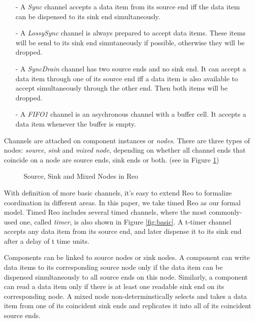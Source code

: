 \documentclass[conference, a4paper]{IEEEtran}
\begin{document}
\begin{itemize}
  \item [-] A \emph{Sync} channel accepts a data item from its source end iff the data item can be
    dispensed to its sink end simultaneously.
  \item [-] A \emph{LossySync} channel is always prepared to accept data items. These items will be
    send to its sink end simutaneously if possible, otherwise they will be dropped.
  \item [-] A \emph{SyncDrain} channel has two source ends and no sink end. It can accept a data
    item through one of its source end iff a data item is also available to accept simultaneously
    through the other end. Then both items will be dropped.
  \item [-] A \emph{FIFO1} channel is an asychronous channel with a buffer cell. It accepts a
    data item whenever the buffer is empty. 
\end{itemize}

Channels are attached on component instances or \emph{nodes}. There are three types of nodes:
\emph{source}, \emph{sink} and \emph{mixed node}, depending on whether all channel ends that
coincide on a node are source ends, sink ends or both. (see in Figure \ref{fig:node})

\begin{figure}[ht]
  \begin{center}
    
  \end{center}
  \caption{Source, Sink and Mixed Nodes in Reo}
  \label{fig:node}
\end{figure}



With definition of more basic channels, it's easy to extend Reo to formalize coordination in
different areas. In this paper, we take timed Reo\cite{DBLP:conf/sefm/ArbabBBR04} as our formal
model. Timed Reo includes several timed channels, where the most commonly-used one, called
\emph{timer}, is also shown in Figure \ref{fig:basic}. A t-timer channel accepts any data item from
its source end, and later dispense it to its sink end after a delay of t time units.

Components can be linked to source nodes or sink nodes. A component can write data items to its
corresponding source node only if the data item can be dispensed simultaneously to all source ends
on this node. Similarly, a component can read a data item only if there is at least one readable
sink end on its corresponding node. A mixed node non-determinstically selects and takes a data item
from one of its coincident sink ends and replicates it into all of its coincident source ends.
\end{document}
